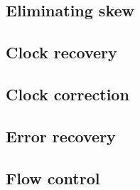		
		\subsection{Eliminating skew}
			
		
		\subsection{Clock recovery}
			
		
		\subsection{Clock correction}
			
		
		\subsection{Error recovery}
			
		
		\subsection{Flow control}
			
